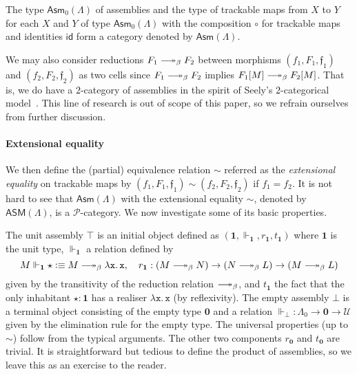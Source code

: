 \documentclass[a4paper,UKenglish,numberwithinsect,cleveref,thm-restate]{lipics-v2021}
\newcommand{\PP}{\mathscr{P}}
\newcommand{\Asm}{\mathsf{Asm}}
\newcommand{\ASM}{\mathsf{ASM}}
\newcommand{\defeq}{\vcentcolon\equiv}
\newcommand{\Univ}{\mathcal{U}}
\newcommand{\id}{\mathsf{id}}
\newcommand{\Unit}{\mathbf{1}}
\newcommand{\Empty}{\mathbf{0}}
\DeclareRobustCommand\longtwoheadrightarrow{\relbar\joinrel\twoheadrightarrow}
\newcommand{\reduce}{\longtwoheadrightarrow_{\beta}}
\theoremstyle{plain}
\begin{document}
\begin{proposition}\label{prop:category-of-assemblies}
  The type $\Asm_0(\Lambda)$ of assemblies and the type of trackable maps from $X$ to $Y$ for each $X$ and $Y$ of type $\Asm_0(\Lambda)$ with the composition $\circ$ for trackable maps and identities $\id$ form a category denoted by $\Asm(\Lambda)$.
\end{proposition}
We may also consider reductions $F_1 \reduce F_2$ between morphisms $(f_1, F_1, \mathfrak{f}_1)$
and $(f_2, F_2, \mathfrak{f}_2)$ as two cells since $F_1 \reduce F_2$ implies $F_1[M] \reduce F_2[M]$.
That is, we do have a $2$-category of assemblies in the spirit of Seely's $2$-categorical model~\cite{Seely1987}.
This line of research is out of scope of this paper, so we refrain ourselves from further discussion. 


\paragraph*{Extensional equality}
We then define the (partial) equivalence relation $\sim$ referred as the \emph{extensional equality} on trackable maps by $(f_1, F_1, \mathfrak{f}_1) \sim (f_2, F_2, \mathfrak{f}_2)$ if $f_1 = f_2$.
It is not hard to see that $\Asm(\Lambda)$ with the extensional equality $\sim$, denoted by $\ASM(\Lambda)$, is a $\PP$-category. 
We now investigate some of its basic properties.

The unit assembly $\top$ is an initial object defined as $(\Unit, \Vdash_{\Unit}, r_{\Unit}, t_{\Unit})$ where $\Unit$ is the unit type,  
$\Vdash_{\Unit}$ a relation defined by
\[
  M \Vdash_{\Unit} \star \defeq M \reduce \mathtt{\lambda x.\, x}, 
  \quad r_{\Unit}: (M \reduce N) \to (N \reduce L) \to (M \reduce L)
\]
given by the transitivity of the reduction relation $\reduce$, and $t_{\Unit}$ the fact that the only inhabitant $\star : \Unit$ has a realiser $\mathtt{\lambda x.\, x}$ (by reflexivity).
The empty assembly $\bot$ is a terminal object consisting of the empty type $\Empty$ and a relation $\Vdash_\bot : \Lambda_0 \to \Empty \to \Univ$ given by the elimination rule for the empty type.
The universal properties (up to $\sim$) follow from the typical arguments. 
The other two components $r_\Empty$ and $t_\Empty$ are trivial.
It is straightforward but tedious to define the product of assemblies, so we leave this as an exercise to the reader. 
\end{document}
